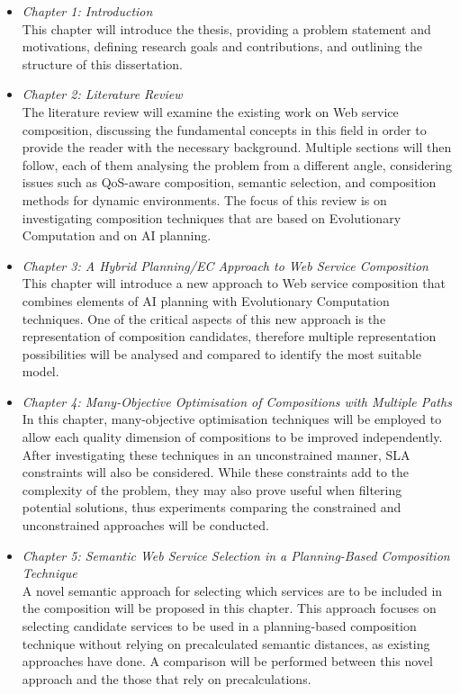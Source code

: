 \begin{itemize}
 \item \textit{Chapter 1: Introduction}\\
 This chapter will introduce the thesis, providing a problem statement and motivations, defining research goals and contributions, and outlining the structure of this dissertation.
 \item \textit{Chapter 2: Literature Review}\\
 The literature review will examine the existing work on Web service composition, discussing the fundamental concepts in this field in order to provide the reader with the necessary background. Multiple sections will then follow, each of them analysing the problem from a different angle, considering issues such as QoS-aware composition, semantic selection, and composition methods for dynamic environments. The focus of this review is on investigating composition techniques that are based on Evolutionary Computation and on AI planning.
 \item \textit{Chapter 3: A Hybrid Planning/EC Approach to Web Service Composition}\\
 This chapter will introduce a new approach to Web service composition that combines elements of AI planning with Evolutionary Computation techniques. One of the critical aspects of this new approach is the representation of composition candidates, therefore multiple representation possibilities will be analysed and compared to identify the most suitable model. 
 \item \textit{Chapter 4: Many-Objective Optimisation of Compositions with Multiple Paths}\\
 In this chapter, many-objective optimisation techniques will be employed to allow each quality dimension of compositions to be improved independently. After investigating these techniques in an unconstrained manner, SLA constraints will also be considered. While these constraints add to the complexity of the problem, they may also prove useful when filtering potential solutions, thus experiments comparing the constrained and unconstrained approaches will be conducted.
 \item \textit{Chapter 5: Semantic Web Service Selection in a Planning-Based Composition Technique}\\
 A novel semantic approach for selecting which services are to be included in the composition will be proposed in this chapter. This approach focuses on selecting candidate services to be used in a planning-based composition technique without relying on precalculated semantic distances, as existing approaches have done. A comparison will be performed between this novel approach and the those that rely on precalculations.

\end{itemize}
